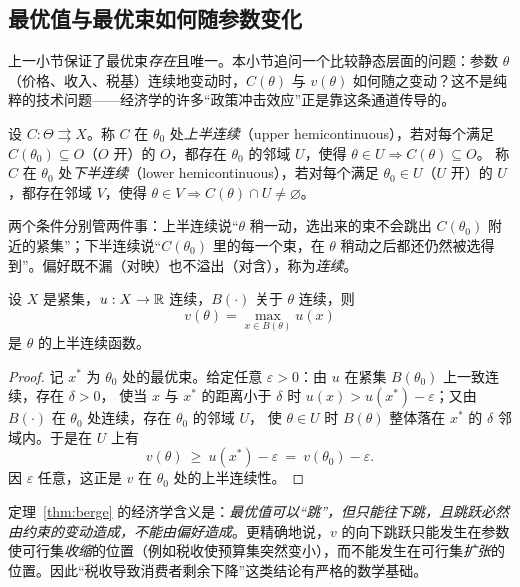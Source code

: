 \subsection{最优值与最优束如何随参数变化}

上一小节保证了最优束\emph{存在}且唯一。本小节追问一个比较静态层面的问题：参数 $\theta$（价格、收入、税基）连续地变动时，$C(\theta)$ 与 $v(\theta)$ 如何随之变动？这不是纯粹的技术问题——经济学的许多“政策冲击效应”正是靠这条通道传导的。

\begin{definition}
设 $C:\Theta\rightrightarrows X$。称 $C$ 在 $\theta_{0}$ 处\emph{上半连续}（upper hemicontinuous），若对每个满足 $C(\theta_{0})\subseteq O$（$O$ 开）的 $O$，都存在 $\theta_{0}$ 的邻域 $U$，使得 $\theta\in U\Rightarrow C(\theta)\subseteq O$。
称 $C$ 在 $\theta_{0}$ 处\emph{下半连续}（lower hemicontinuous），若对每个满足 $\theta_{0}\in U$（$U$ 开）的 $U$，都存在邻域 $V$，使得 $\theta\in V\Rightarrow C(\theta)\cap U\neq\varnothing$。
\end{definition}

两个条件分别管两件事：上半连续说“$\theta$ 稍一动，选出来的束不会跳出 $C(\theta_{0})$ 附近的紧集”；下半连续说“$C(\theta_{0})$ 里的每一个束，在 $\theta$ 稍动之后都还仍然被选得到”。偏好既不漏（对映）也不溢出（对含），称为\emph{连续}。

\begin{theorem}[最优值函数上半连续]\label{thm:berge}
设 $X$ 是紧集，$u:X\to\mathbb{R}$ 连续，$B(\cdot)$ 关于 $\theta$ 连续，则
\[
v(\theta)=\max_{x\in B(\theta)}u(x)
\]
是 $\theta$ 的上半连续函数。
\end{theorem}

\begin{proof}
记 $x^{*}$ 为 $\theta_{0}$ 处的最优束。给定任意 $\varepsilon>0$：由 $u$ 在紧集 $B(\theta_{0})$ 上一致连续，存在 $\delta>0$，
使当 $x$ 与 $x^{*}$ 的距离小于 $\delta$ 时 $u(x)>u(x^{*})-\varepsilon$；又由 $B(\cdot)$ 在 $\theta_{0}$ 处连续，存在 $\theta_{0}$ 的邻域 $U$，
使 $\theta\in U$ 时 $B(\theta)$ 整体落在 $x^{*}$ 的 $\delta$ 邻域内。于是在 $U$ 上有
\[
v(\theta)\ \ge\ u(x^{*})-\varepsilon\ =\ v(\theta_{0})-\varepsilon .
\]
因 $\varepsilon$ 任意，这正是 $v$ 在 $\theta_{0}$ 处的上半连续性。
\end{proof}

定理~\ref{thm:berge} 的经济学含义是：\emph{最优值可以“跳”，但只能往下跳，且跳跃必然由约束的变动造成，不能由偏好造成}。更精确地说，$v$ 的向下跳跃只能发生在参数使可行集\emph{收缩}的位置（例如税收使预算集突然变小），而不能发生在可行集\emph{扩张}的位置。因此“税收导致消费者剩余下降”这类结论有严格的数学基础。

